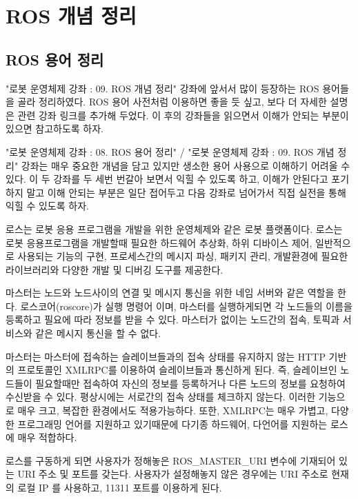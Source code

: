 
\chapter{ROS 개념 정리}

\section{ROS 용어 정리}\label{sec:RosTerm}

"로봇 운영체제 강좌 : 09. ROS 개념 정리" 강좌에 앞서서 많이 등장하는 ROS 용어들을 골라 정리하였다. ROS 용어 사전처럼 이용하면 좋을 듯 싶고, 보다 더 자세한 설명은 관련 강좌 링크를 추가해 두었다. 이 후의 강좌들을 읽으면서 이해가 안되는 부분이 있으면 참고하도록 하자. 

"로봇 운영체제 강좌 : 08. ROS 용어 정리" / "로봇 운영체제 강좌 : 09. ROS 개념 정리" 강좌는 매우 중요한 개념을 담고 있지만 생소한 용어 사용으로 이해하기 어려울 수 있다. 이 두 강좌를 두 세번 번갈아 보면서 익힐 수 있도록 하고, 이해가 안된다고 포기하지 말고 이해 안되는 부분은 일단 접어두고 다음 강좌로 넘어가서 직접 실전을 통해 익힐 수 있도록 하자.

\begin{definition}[ROS]\label{def:Ros}
로스는 로봇 응용 프로그램을 개발을 위한 운영체제와 같은 로봇 플랫폼이다. 로스는 로봇 응용프로그램을 개발할때 필요한 하드웨어 추상화, 하위 디바이스 제어, 일반적으로 사용되는 기능의 구현, 프로세스간의 메시지 파싱, 패키지 관리, 개발환경에 필요한 라이브러리와 다양한 개발 및 디버깅 도구를 제공한다.
\end{definition}

\begin{definition}\label{def:RosMaster}
마스터는 노드와 노드사이의 연결 및 메시지 통신을 위한 네임 서버와 같은 역할을 한다. 로스코어(roscore)가 실행 명령어 이며, 마스터를 실행하게되면 각 노드들의 이름을 등록하고 필요에 따라 정보를 받을 수 있다. 마스터가 없이는 노드간의 접속, 토픽과 서비스와 같은 메시지 통신을 할 수 없다. 

마스터는 마스터에 접속하는 슬레이브들과의 접속 상태를 유지하지 않는 HTTP 기반의 프로토콜인 XMLRPC를 이용하여 슬레이브들과 통신하게 된다. 즉, 슬레이브인 노드들이 필요할때만 접속하여 자신의 정보를 등록하거나 다른 노드의 정보를 요청하여 수신받을 수 있다. 평상시에는 서로간의 접속 상태를 체크하지 않는다. 이러한 기능으로 매우 크고, 복잡한 환경에서도 적용가능하다. 또한, XMLRPC는 매우 가볍고, 다양한 프로그래밍 언어를 지원하고 있기때문에 다기종 하드웨어, 다언어를 지원하는 로스에 매우 적합하다.

로스를 구동하게 되면 사용자가 정해놓은 ROS\_MASTER\_URI 변수에 기재되어 있는 URI 주소 및 포트를 갖는다. 사용자가 설정해놓지 않은 경우에는 URI 주소로 현재의 로컬 IP 를 사용하고, 11311 포트를 이용하게 된다.
\end{definition}

